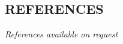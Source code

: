 \documentclass[margin,line]{resume}
\begin{document}
\begin{resume}
\sectionline

\section{\mysidestyle \textbf{\large{R}\small{EFERENCES}}}

    \textsl{References available on request}

\end{resume}
\end{document}
